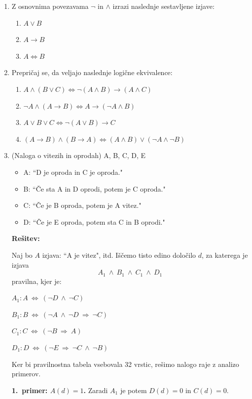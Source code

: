 \documentclass[11pt,paper=b5,footinclude,headinclude]{scrbook} %
\def\inn {{~\wedge~}}
\def\sledi {{~\Rightarrow~}}
\def\cee {{~\Leftrightarrow~}}
\begin{document}
\begin{enumerate}
\item Z osnovnima povezavama $\neg$ in $\land$ izrazi naslednje sestavljene izjave:
\begin{enumerate}
  \item $A \lor B$
  \item $A \rightarrow B$
  \item $A \iff B$
\end{enumerate}

\item Prepričaj se, da veljajo naslednje logične ekvivalence:
\begin{enumerate}
  \item $A \land (B \lor C) \iff \neg (A \land B) \rightarrow (A \land C)$
  \item $\neg A \land (A \rightarrow B) \iff A \rightarrow (\neg A \land B)$
  \item $A \lor B \lor C \iff \neg (A \lor B) \rightarrow C$
  \item $(A \rightarrow B) \land (B \rightarrow A) \iff (A \land B) \lor (\neg A \land \neg B)$
\end{enumerate}

    \item 
    (Naloga o vitezih in oprodah)
A, B, C, D, E
\begin{itemize}
  \item A: ``D je oproda in C je oproda."
  \item B: ``Če sta A in D oprodi, potem je C oproda."
  \item C: ``Če je B oproda, potem je A vitez."
  \item D: ``Če je E oproda, potem sta C in B oprodi."
\end{itemize}

\medskip
\textbf{Rešitev:}

Naj bo $A$ izjava: ``A je vitez", itd.
Iščemo tisto edino določilo $d$, za katerega je izjava $$A_1\inn B_1\inn C_1\inn D_1$$
pravilna, kjer je:

$A_1: A\cee (\neg D \inn \neg C)$

$B_1: B\cee (\neg A \inn \neg D\sledi \neg C)$

$C_1: C\cee (\neg B \sledi A)$

$D_1: D\cee (\neg E \sledi \neg C \inn \neg B)$


Ker bi pravilnostna tabela vsebovala 32 vrstic, rešimo nalogo
raje z analizo primerov.

\textbf{1.~primer: $A(d) = 1$.}
Zaradi $A_1$ je potem $D(d) = 0$ in $C(d) = 0$.


\end{enumerate}
\end{document}
